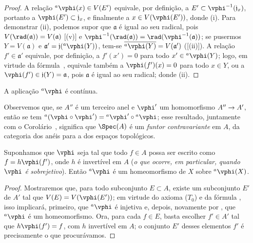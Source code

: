 \documentclass[oneside]{amsart}
\makeatletter
\newcommand{\ega@arrow}[2]{\mathchoice{#1}{#2}{#2}{#2}}
\renewcommand{\to}{\ega@arrow{\longrightarrow}{\rightarrow}}
\newcommand{\oldpage}[2][]{{\marginnote{\normalfont\textbf{#1}~|~#2}}\ignorespaces}
\let\EGAOriginalLabel\label
\renewcommand{\label}[1]{\phantomsection\EGAOriginalLabel{#1}}
\makeatother
\begin{document}
\begin{proof}
A relação ${}^a\vphi(x)\in V(E')$ equivale, por definição, a $E'\subset\vphi^{-1}(\mathfrak{j}_x)$, portanto a $\vphi(E')\subset\mathfrak{j}_x$, e finalmente a $x\in V(\vphi(E'))$, donde (i).
Para demonstrar (ii), podemos supor que $\mathfrak{a}$ é igual ao seu radical, pois $V(\rad(\mathfrak{a}))=V(\mathfrak{a})$ [(v)] e $\vphi^{-1}(\rad(\mathfrak{a}))=\rad(\vphi^{-1}(\mathfrak{a}))$;
se pusermos $Y=V(\mathfrak{a})$ e $\mathfrak{a}'=\mathfrak{j}({}^a\vphi(Y))$, tem-se $\overline{{}^a\vphi(Y)}=V(\mathfrak{a}')$ ([(ii)]).
A relação $f'\in\mathfrak{a}'$ equivale, por definição, a $f'(x')=0$ para todo $x'\in{}^a\vphi(Y)$; logo, em virtude da fórmula~, equivale também a $\vphi(f')(x)=0$ para todo $x\in Y$, ou a $\vphi(f')\in\mathfrak{j}(Y)=\mathfrak{a}$, pois $\mathfrak{a}$ é igual ao seu radical;
donde (ii).
\end{proof}

\begin{corollary}[1.2.3]
\label{I.1.2.3}
A aplicação ${}^a\vphi$ é contínua.
\end{corollary}

Observemos que, se $A''$ é um terceiro anel e $\vphi'$ um homomorfismo $A''\to A'$, então se tem ${}^a(\vphi\circ\vphi')={}^a\vphi'\circ{}^a\vphi$;
esse resultado, juntamente com o Corolário~, significa que $\Spec(A)$ é um \emph{funtor contravariante} em $A$, da categoria dos anéis para a dos espaços topológicos.

\begin{corollary}[1.2.4]
\label{I.1.2.4}
\oldpage[I]{84}
Suponhamos que $\vphi$ seja tal que todo $f\in A$ possa ser escrito como $f=h\vphi(f')$, onde $h$ é invertível em $A$ (\emph{o que ocorre, em particular, quando $\vphi$ é \emph{sobrejetivo}}).
Então ${}^a\vphi$ é um homeomorfismo de $X$ sobre ${}^a\vphi(X)$.
\end{corollary}

\begin{proof}
Mostraremos que, para todo subconjunto $E\subset A$, existe um subconjunto $E'$ de $A'$ tal que $V(E)=V(\vphi(E'))$;
em virtude do axioma ($T_0$)  e da fórmula , isso implicará, primeiro, que ${}^a\vphi$ é injetiva e, depois, novamente por , que ${}^a\vphi$ é um homeomorfismo.
Ora, para cada $f\in E$, basta escolher $f'\in A'$ tal que $h\vphi(f')=f$, com $h$ invertível em $A$;
o conjunto $E'$ desses elementos $f'$ é precisamente o que procurávamos.
\end{proof}
\end{document}

